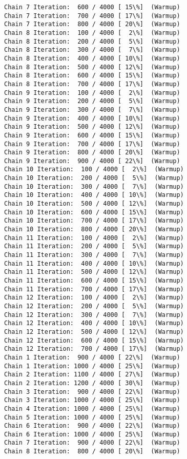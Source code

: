\documentclass[11pt]{article}
\begin{document}
\begin{Verbatim}[commandchars=\\\{\}]
Chain 7 Iteration:  600 / 4000 [ 15\%]  (Warmup)
Chain 7 Iteration:  700 / 4000 [ 17\%]  (Warmup)
Chain 7 Iteration:  800 / 4000 [ 20\%]  (Warmup)
Chain 8 Iteration:  100 / 4000 [  2\%]  (Warmup)
Chain 8 Iteration:  200 / 4000 [  5\%]  (Warmup)
Chain 8 Iteration:  300 / 4000 [  7\%]  (Warmup)
Chain 8 Iteration:  400 / 4000 [ 10\%]  (Warmup)
Chain 8 Iteration:  500 / 4000 [ 12\%]  (Warmup)
Chain 8 Iteration:  600 / 4000 [ 15\%]  (Warmup)
Chain 8 Iteration:  700 / 4000 [ 17\%]  (Warmup)
Chain 9 Iteration:  100 / 4000 [  2\%]  (Warmup)
Chain 9 Iteration:  200 / 4000 [  5\%]  (Warmup)
Chain 9 Iteration:  300 / 4000 [  7\%]  (Warmup)
Chain 9 Iteration:  400 / 4000 [ 10\%]  (Warmup)
Chain 9 Iteration:  500 / 4000 [ 12\%]  (Warmup)
Chain 9 Iteration:  600 / 4000 [ 15\%]  (Warmup)
Chain 9 Iteration:  700 / 4000 [ 17\%]  (Warmup)
Chain 9 Iteration:  800 / 4000 [ 20\%]  (Warmup)
Chain 9 Iteration:  900 / 4000 [ 22\%]  (Warmup)
Chain 10 Iteration:  100 / 4000 [  2\%]  (Warmup)
Chain 10 Iteration:  200 / 4000 [  5\%]  (Warmup)
Chain 10 Iteration:  300 / 4000 [  7\%]  (Warmup)
Chain 10 Iteration:  400 / 4000 [ 10\%]  (Warmup)
Chain 10 Iteration:  500 / 4000 [ 12\%]  (Warmup)
Chain 10 Iteration:  600 / 4000 [ 15\%]  (Warmup)
Chain 10 Iteration:  700 / 4000 [ 17\%]  (Warmup)
Chain 10 Iteration:  800 / 4000 [ 20\%]  (Warmup)
Chain 11 Iteration:  100 / 4000 [  2\%]  (Warmup)
Chain 11 Iteration:  200 / 4000 [  5\%]  (Warmup)
Chain 11 Iteration:  300 / 4000 [  7\%]  (Warmup)
Chain 11 Iteration:  400 / 4000 [ 10\%]  (Warmup)
Chain 11 Iteration:  500 / 4000 [ 12\%]  (Warmup)
Chain 11 Iteration:  600 / 4000 [ 15\%]  (Warmup)
Chain 11 Iteration:  700 / 4000 [ 17\%]  (Warmup)
Chain 12 Iteration:  100 / 4000 [  2\%]  (Warmup)
Chain 12 Iteration:  200 / 4000 [  5\%]  (Warmup)
Chain 12 Iteration:  300 / 4000 [  7\%]  (Warmup)
Chain 12 Iteration:  400 / 4000 [ 10\%]  (Warmup)
Chain 12 Iteration:  500 / 4000 [ 12\%]  (Warmup)
Chain 12 Iteration:  600 / 4000 [ 15\%]  (Warmup)
Chain 12 Iteration:  700 / 4000 [ 17\%]  (Warmup)
Chain 1 Iteration:  900 / 4000 [ 22\%]  (Warmup)
Chain 1 Iteration: 1000 / 4000 [ 25\%]  (Warmup)
Chain 2 Iteration: 1100 / 4000 [ 27\%]  (Warmup)
Chain 2 Iteration: 1200 / 4000 [ 30\%]  (Warmup)
Chain 3 Iteration:  900 / 4000 [ 22\%]  (Warmup)
Chain 3 Iteration: 1000 / 4000 [ 25\%]  (Warmup)
Chain 4 Iteration: 1000 / 4000 [ 25\%]  (Warmup)
Chain 5 Iteration: 1000 / 4000 [ 25\%]  (Warmup)
Chain 6 Iteration:  900 / 4000 [ 22\%]  (Warmup)
Chain 6 Iteration: 1000 / 4000 [ 25\%]  (Warmup)
Chain 7 Iteration:  900 / 4000 [ 22\%]  (Warmup)
Chain 8 Iteration:  800 / 4000 [ 20\%]  (Warmup)

\end{Verbatim}
\end{document}
